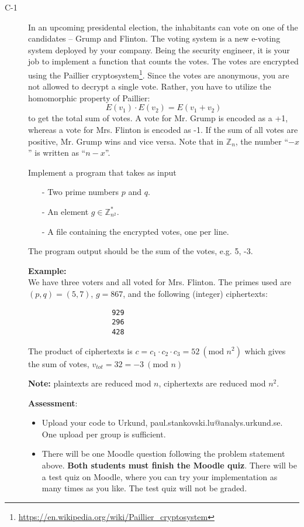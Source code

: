 \documentclass{article}
\begin{document}
			\begin{description}
				\item[C-1]{In an upcoming presidental election, the inhabitants can vote on one of the candidates --
					Grump and Flinton. The voting system is a new e-voting system deployed by your company. Being the
					security engineer, it is your job to implement a function that counts the votes. The votes are encrypted
					using the Paillier cryptosystem\footnote{\url{https://en.wikipedia.org/wiki/Paillier_cryptosystem}}. Since the votes are anonymous, you are not allowed to decrypt a single vote.
					Rather, you have to utilize the homomorphic property of Paillier:
					\[
					E(v_1) \cdot E(v_2) = E(v_1 + v_2)
					\]	
					to get the total sum of votes. A vote for Mr. Grump is encoded as a +1, whereas a vote for Mrs. Flinton
					is encoded as -1. If the sum of all votes are positive, Mr. Grump wins and vice versa. Note that in
					$\mathbb{Z}_n$, the number ``$-x$'' is written as ``$n-x$''.
					
					Implement a program that takes as input
					\begin{itemize}
						\item[-] Two prime numbers $p$ and $q$.
						\item[-] An element $g \in \mathbb{Z}_{n^2}^{*}$.
						\item[-] A file containing the encrypted votes, one per line.
					\end{itemize}
					
					The program output should be the sum of the votes, e.g. 5, -3.
					
					\textbf{Example:}\\
					We have three voters and all voted for Mrs. Flinton. The primes used are
					$(p, q) = (5, 7)$, $g = 867$, and the following (integer) ciphertexts:
					\begin{verbatim}
					929
					296
					428
					\end{verbatim}
					The product of ciphertexts is $c = c_1 \cdot c_2 \cdot c_3 = 52 ~(\textrm{mod } n^2)$
					which gives the sum of votes, $v_{tot} = 32 = -3 ~(\textrm{mod } n)$
					
					\textbf{Note:} plaintexts are reduced mod $n$, ciphertexts are reduced mod $n^2$.
					
					\textbf{Assessment}:
					\begin{itemize}
						\item Upload your code to Urkund, paul.stankovski.lu@analys.urkund.se.
						One upload per group is sufficient.
						
						\item There will be one Moodle question following the problem statement above. 
						\textbf{Both students must finish the Moodle quiz}.
						There will be a test quiz on Moodle, where you can try your implementation as many times as you like. 
						The test quiz will not be graded.
					\end{itemize}}
					
				\end{description}
				
\end{document}
